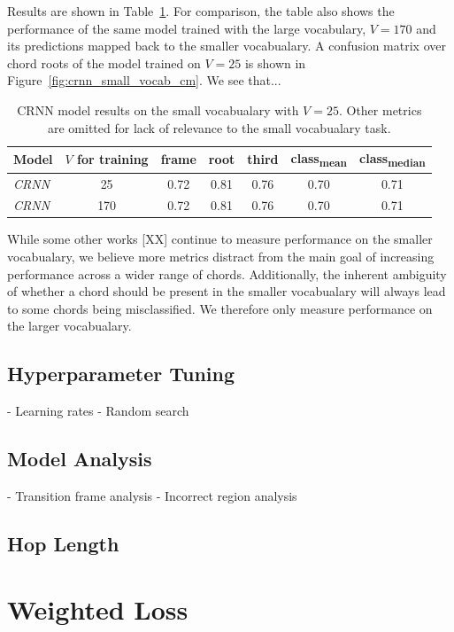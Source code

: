 Results are shown in Table~\ref{tab:crnn_small_vocab}. For comparison, the table also shows the performance of the same model trained with the large vocabulary, $V=170$ and its predictions mapped back to the smaller vocabualary. A confusion matrix over chord roots of the model trained on $V=25$ is shown in Figure~\ref{fig:crnn_small_vocab_cm}. We see that...

\begin{table}[h]
    \centering
    \begin{tabular}{lcccccc}
        \toprule
        Model & $V$ for training & frame & root & third & class\textsubscript{mean} & class\textsubscript{median} \\  
        \midrule
        \emph{CRNN} & 25 & 0.72 & 0.81 & 0.76 & 0.70 & 0.71 \\
        \emph{CRNN} & 170 & 0.72 & 0.81 & 0.76 & 0.70 & 0.71 \\
        \bottomrule
    \end{tabular}
    \caption{CRNN model results on the small vocabualary with $V=25$. Other metrics are omitted for lack of relevance to the small vocabualary task.}
    \label{tab:crnn_small_vocab}
\end{table}

While some other works [XX] continue to measure performance on the smaller vocabualary, we believe more metrics distract from the main goal of increasing performance across a wider range of chords. Additionally, the inherent ambiguity of whether a chord should be present in the smaller vocabualary will always lead to some chords being misclassified. We therefore only measure performance on the larger vocabualary.

\subsection{Hyperparameter Tuning}
- Learning rates
- Random search
\subsection{Model Analysis}
- Transition frame analysis
- Incorrect region analysis
\subsection{Hop Length}

\section{Weighted Loss}

